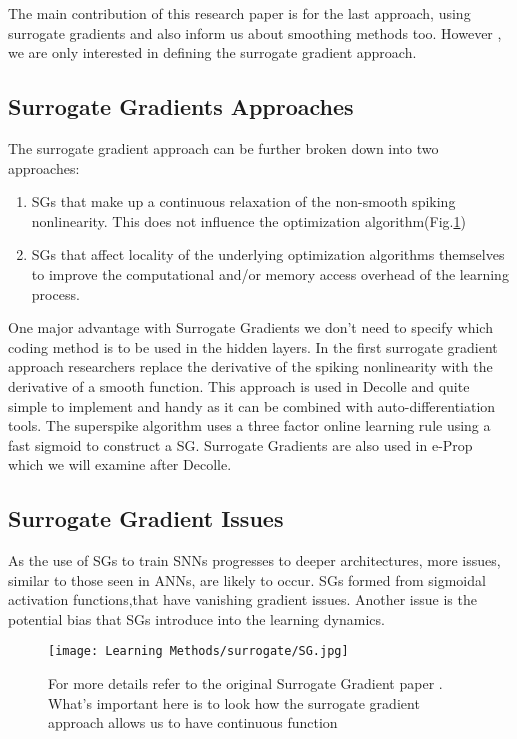 \documentclass[12pt]{report}
\begin{document}
The main contribution of this research paper is for the last approach, using surrogate gradients and also inform us about smoothing methods too. However , we are only interested in defining the surrogate gradient approach.
\subsection{Surrogate Gradients Approaches}
The surrogate gradient approach can be further broken down into two approaches:
\begin{enumerate}
    \item SGs that make up a continuous relaxation
of the non-smooth spiking nonlinearity. This does not influence the optimization algorithm(Fig.\ref{fig:sg})
    \item SGs that affect locality of the underlying optimization algorithms themselves to improve the computational and/or memory access overhead of the learning process. 
\end{enumerate}
One major advantage with Surrogate Gradients we don't need to specify which coding method is to be used in the hidden layers. In the first surrogate gradient approach researchers replace the derivative of the spiking nonlinearity with the derivative of a smooth function. This approach is used in Decolle and quite simple to implement and handy as it can be combined with auto-differentiation tools. The superspike algorithm uses a three factor online learning rule using a fast sigmoid to construct a SG. Surrogate Gradients are also used in e-Prop which we will examine after Decolle. 
\subsection{Surrogate Gradient Issues}
As the use of SGs to train SNNs progresses to deeper architectures, more issues, similar to those seen in ANNs, are likely to occur. SGs formed from sigmoidal activation functions,that have vanishing gradient issues. Another issue is the potential bias that SGs introduce into the learning dynamics.

\begin{figure}[htp]
    \centering
    \texttt{[image: Learning Methods/surrogate/SG.jpg]}
    \caption{For more details refer to the original Surrogate Gradient paper \cite{neft2019}. What's important here is to look how the surrogate gradient approach allows us to have continuous function}
    \label{fig:sg}
\end{figure}
\end{document}

